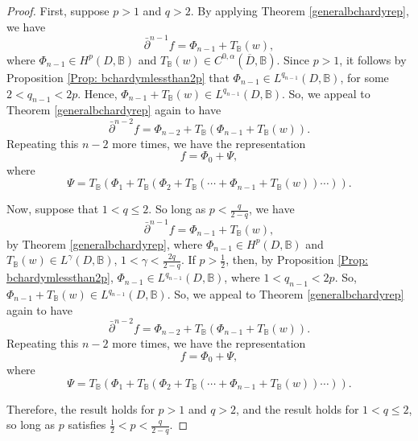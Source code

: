 \documentclass[suppldata]{interact}
\theoremstyle{plain}%
\theoremstyle{definition}
\theoremstyle{remark}
\newcommand{\dbar}{\bar\partial}
\newcommand{\bc}{\mathbb{B}}
\begin{document}
\begin{proof}
First, suppose $p > 1$ and $q>2$. By applying Theorem \ref{generalbchardyrep}, we have
\[
    \dbar^{n-1}f = \Phi_{n-1} + T_\bc(w),
\]
where $\Phi_{n-1} \in H^p(D,\bc)$ and $T_\bc(w) \in C^{0,\alpha}(\overline{D},\bc)$. Since $p>1$, it follows by Proposition \ref{Prop: bchardymlessthan2p} that $\Phi_{n-1} \in L^{q_{n-1}}(D,\bc)$, for some $2 < q_{n-1} < 2p$. Hence, $\Phi_{n-1} + T_\bc(w) \in L^{q_{n-1}}(D,\bc)$. So, we appeal to Theorem \ref{generalbchardyrep} again to have
\[
    \dbar^{n-2}f = \Phi_{n-2} + T_\bc(\Phi_{n-1} + T_\bc(w)).
\]
Repeating this $n-2$ more times, we have the representation
\[
        f = \Phi_0 + \Psi,
    \]
    where
    \[
        \Psi = T_\bc( \Phi_1 + T_\bc( \Phi_2 + T_\bc( \cdots + \Phi_{n-1} + T_\bc(w))\cdots) ).
    \]

Now, suppose that $1< q \leq 2$. So long as $p < \frac{q}{2-q}$, we have 
\[
    \dbar^{n-1}f = \Phi_{n-1} + T_\bc(w),
\]
by Theorem \ref{generalbchardyrep}, where $\Phi_{n-1} \in H^p(D, \bc)$ and $T_\bc(w) \in L^\gamma(D,\bc)$, $1 < \gamma < \frac{2q}{2-q}$. If $p > \frac{1}{2}$, then, by Proposition \ref{Prop: bchardymlessthan2p}, $\Phi_{n-1} \in L^{q_{n-1}}(D,\bc)$, where $1 < q_{n-1} < 2p$. So, $\Phi_{n-1} + T_\bc(w) \in L^{q_{n-1}}(D,\bc)$. So, we appeal to Theorem \ref{generalbchardyrep} again to have
\[
    \dbar^{n-2}f = \Phi_{n-2} + T_\bc(\Phi_{n-1} + T_\bc(w)).
\]
Repeating this $n-2$ more times, we have the representation
\[
        f = \Phi_0 + \Psi,
    \]
    where
    \[
        \Psi = T_\bc( \Phi_1 + T_\bc( \Phi_2 + T_\bc( \cdots + \Phi_{n-1} + T_\bc(w))\cdots) ).
    \]

Therefore, the result holds for $p>1$ and $q>2$, and the result holds for $1 < q \leq 2$, so long as $p$ satisfies $\frac{1}{2} < p < \frac{q}{2-q}$. 

\end{proof}
\end{document}
